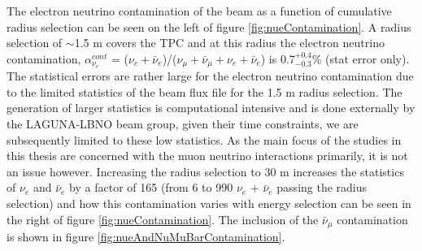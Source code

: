 The electron neutrino contamination of the beam as a function of cumulative radius selection can be seen on the left of figure \ref{fig:nueContamination}. A radius selection of $\sim$1.5 m covers the TPC and at this radius the electron neutrino contamination, $\alpha_{\nu_{e}}^{cont}$ = ($\nu_{e} + \bar{\nu}_{e}$)/($\nu_{\mu} + \bar{\nu}_{\mu} + \nu_{e} + \bar{\nu}_{e}$) is 0.7$^{+0.4}_{-0.3}$\% (stat error only). The statistical errors are rather large for the electron neutrino contamination due to the limited statistics of the beam flux file for the 1.5 m radius selection. The generation of larger statistics is computational intensive and is done externally by the LAGUNA-LBNO beam group, given their time constraints, we are subsequently limited to these low statistics. As the main focus of the studies in this thesis are concerned with the muon neutrino interactions primarily, it is not an issue however. Increasing the radius selection to 30 m increases the statistics of $\nu_{e}$ and $\bar{\nu}_{e}$ by a factor of 165 (from 6 to 990 $\nu_{e}$ + $\bar{\nu}_{e}$ passing the radius selection) and how this contamination varies with energy selection can be seen in the right of figure \ref{fig:nueContamination}. The inclusion of the $\bar{\nu}_{\mu}$ contamination is shown in figure \ref{fig:nueAndNuMuBarContamination}.

